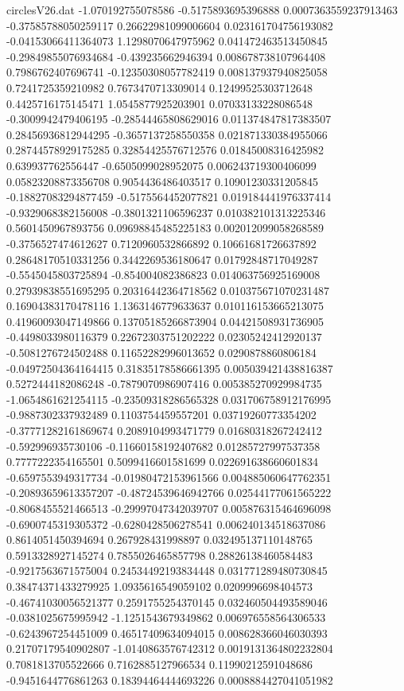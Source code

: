 \begin{filecontents}{circlesV26.dat}
-1.070192755078586	-0.5175893695396888	0.0007363559237913463
-0.37585788050259117	0.26622981099006604	0.023161704756193082
-0.04153066411364073	1.1298070647975962	0.041472463513450845
-0.29849855076934684	-0.439235662946394	0.008678738107964408
0.7986762407696741	-0.12350308057782419	0.008137937940825058
0.7241725359210982	0.7673470713309014	0.12499525303712648
0.4425716175145471	1.0545877925203901	0.07033133228086548
-0.3009942479406195	-0.28544465808629016	0.011374847817383507
0.28456936812944295	-0.3657137258550358	0.021871330384955066
0.28744578929175285	0.32854425576712576	0.01845008316425982
0.639937762556447	-0.6505099028952075	0.006243719300406099
0.05823208873356708	0.9054436486403517	0.10901230331205845
-0.18827083294877459	-0.5175564452077821	0.019184441976337414
-0.9329068382156008	-0.3801321106596237	0.010382101313225346
0.5601450967893756	0.09698845485225183	0.002012099058268589
-0.3756527474612627	0.7120960532866892	0.10661681726637892
0.28648170510331256	0.3442269536180647	0.01792848717049287
-0.5545045803725894	-0.854004082386823	0.014063756925169008
0.27939838551695295	0.20316442364718562	0.010375671070231487
0.16904383170478116	1.1363146779633637	0.010116153665213075
0.41960093047149866	0.13705185266873904	0.04421508931736905
-0.4498033980116379	0.22672303751202222	0.02305242412920137
-0.5081276724502488	0.11652282996013652	0.0290878860806184
-0.04972504364164415	0.31835178586661395	0.005039421438816387
0.5272444182086248	-0.7879070986907416	0.005385270929984735
-1.0654861621254115	-0.23509318286565328	0.031706758912176995
-0.9887302337932489	0.1103754459557201	0.03719260773354202
-0.37771282161869674	0.2089104993471779	0.01680318267242412
-0.592996935730106	-0.11660158192407682	0.01285727997537358
0.7777222354165501	0.5099416601581699	0.022691638660601834
-0.6597553949317734	-0.01980472153961566	0.004885060647762351
-0.20893659613357207	-0.48724539646942766	0.02544177061565222
-0.8068455521466513	-0.29997047342039707	0.005876315464696098
-0.6900745319305372	-0.6280428506278541	0.006240134518637086
0.8614051450394694	0.267928431998897	0.032495137110148765
0.5913328927145274	0.7855026465857798	0.28826138460584483
-0.9217563671575004	0.24534492193834448	0.031771289480730845
0.38474371433279925	1.0935616549059102	0.0209996698404573
-0.46741030056521377	0.2591755254370145	0.032460504493589046
-0.0381025675995942	-1.1251543679349862	0.006976558564306533
-0.6243967254451009	0.46517409634094015	0.008628366046030393
0.21707179540902807	-1.0140863576742312	0.0019131364802232804
0.7081813705522666	0.7162885127966534	0.11990212591048686
-0.9451644776861263	0.18394464444693226	0.0008884427041051982

\end{filecontents}
